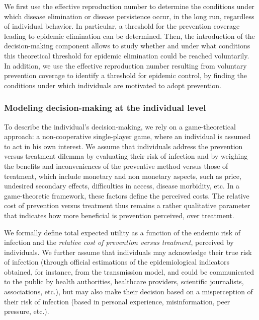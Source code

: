 We first use the effective reproduction number to determine the conditions under which disease elimination or disease persistence occur, in the long run, regardless of individual behavior. In particular, a threshold for the prevention coverage leading to epidemic elimination can be determined. Then, the introduction of the decision-making component allows to study whether and under what conditions this theoretical threshold for epidemic elimination could be reached voluntarily. In addition, we use the effective reproduction number resulting from voluntary prevention coverage to identify a threshold for epidemic control, by finding the conditions under which individuals are motivated to adopt prevention.

\subsubsection{Modeling decision-making at the individual level}
To describe the individual's decision-making, we rely on a game-theoretical approach: a non-cooperative single-player game, where an individual is assumed to act in his own interest. We assume that individuals address the prevention versus treatment dilemma by evaluating their risk of infection and by weighing the benefits and inconveniences of the preventive method versus those of treatment, which include monetary and non monetary aspects, such as price, undesired secondary effects, difficulties in access, disease morbidity, etc. In a game-theoretic framework, these factors define the perceived costs. The relative cost of prevention versus treatment thus remains a rather qualitative parameter that indicates how more beneficial is prevention perceived, over treatment.

We formally define total expected utility as a function of the endemic risk of infection and the {\it relative cost of prevention versus treatment}, perceived by individuals. We further assume that individuals may acknowledge their true risk of infection (through official estimations of the epidemiological indicators obtained, for instance, from the transmission model, and could be communicated to the public by health authorities, healthcare providers, scientific journalists, associations, etc.), but may also make their decision based on a misperception of their risk of infection (based in personal experience, misinformation, peer pressure, etc.). 


